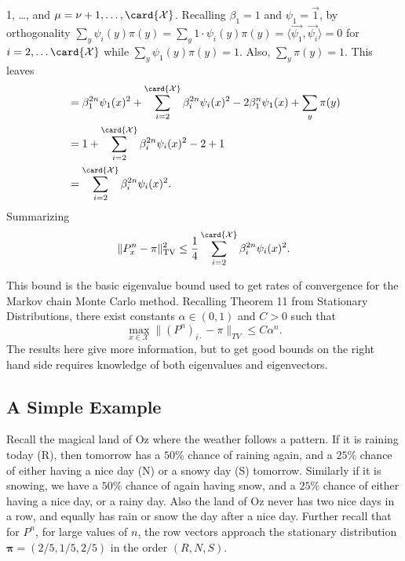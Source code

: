 \documentclass[12pt]{article}
\begin{document}
1, \dots,  \) and \( \mu = \nu+1, \dots, \card{\mathcal
{X}} \).  Recalling \( \beta_1 = 1 \) and \( \psi_1 = \vec{1} \), by
orthogonality \( \sum_y \psi_i(y) \pi(y) = \sum\limits_y 1 \cdot \psi_i(y)
\pi(y) = \langle \vec{\psi_1}, \vec{\psi_i} \rangle = 0 \) for \( i = 2,
\dots \card{\mathcal{X}} \) while \( \sum_y \psi_1(y) \pi(y) = 1 \).
Also, \( \sum_y \pi(y) = 1 \).  This leaves
\begin{align*}
    & = \beta_1^{2n} \psi_1(x)^2 + \sum\limits_{i=2}^{\card{\mathcal{X}}}
    \beta_i^{2n} \psi_i(x)^2 - 2 \beta_1^n \psi_1(x) + \sum\limits_y \pi
    (y) \\
    &= 1 + \sum\limits_{i=2}^{\card{\mathcal{X}}} \beta_i^{2n} \psi_i(x)^2
    - 2 + 1 \\
    &= \sum\limits_{i=2}^{\card{\mathcal{X}}} \beta_i^{2n} \psi_i(x)^2.
\end{align*}
Summarizing
\begin{equation}
    \|P^n_x - \pi \|^2_{\text{TV}} \le \frac{1}{4} \sum\limits_{i=2}^{\card
    {\mathcal{X}}} \beta_i^{2n} \psi_i(x)^2.%
    \label{eq:montecarlo:bound}
\end{equation}

This bound is the basic eigenvalue bound used to get rates of
convergence for the Markov chain Monte Carlo method.  Recalling Theorem
11 from Stationary Distributions, there exist constants \( \alpha \in (0,1)
\) and \( C > 0 \) such that
\[
    \max_{x \in \mathcal{X}} \| (P^n)_{i \cdot} - \pi \|_{TV} \le C
    \alpha^n.
\] The results here give more information, but to get good bounds on the
right hand side requires knowledge of both eigenvalues and eigenvectors.

\subsection*{A Simple Example}

Recall the magical land of Oz where the weather follows a pattern.  If
it is raining today (R), then tomorrow has a \( 50\% \) chance of
raining again, and a \( 25\% \) chance of either having a nice day (N)
or a snowy day (S) tomorrow.  Similarly if it is snowing, we have a \(
50\% \) chance of again having snow, and a \( 25\% \) chance of either
having a nice day, or a rainy day.  Also the land of Oz never has two
nice days in a row, and equally has rain or snow the day after a nice
day.  Further recall that for \( P^n \), for large values of \( n \),
the row vectors approach the stationary distribution \( \mathbf{\pi}=(2/5,1/5,2/5)
\) in the order \( (R, N, S) \).
\end{document}
